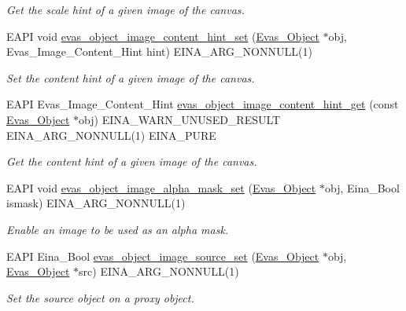 \begin{DoxyCompactItemize}
\begin{DoxyCompactList}\small\item\em Get the scale hint of a given image of the canvas. \item\end{DoxyCompactList}\item 
EAPI void \hyperlink{group__Evas__Object__Image_gaf6cc0faf39773e12eb496116afd67c6f}{evas\_\-object\_\-image\_\-content\_\-hint\_\-set} (\hyperlink{group__Evas__Object__Group_ga9e19e6dd1f517a0ba437c0114d3e7c97}{Evas\_\-Object} $\ast$obj, Evas\_\-Image\_\-Content\_\-Hint hint) EINA\_\-ARG\_\-NONNULL(1)
\begin{DoxyCompactList}\small\item\em Set the content hint of a given image of the canvas. \item\end{DoxyCompactList}\item 
EAPI Evas\_\-Image\_\-Content\_\-Hint \hyperlink{group__Evas__Object__Image_ga28881040682dbbf00937948124e9f3fb}{evas\_\-object\_\-image\_\-content\_\-hint\_\-get} (const \hyperlink{group__Evas__Object__Group_ga9e19e6dd1f517a0ba437c0114d3e7c97}{Evas\_\-Object} $\ast$obj) EINA\_\-WARN\_\-UNUSED\_\-RESULT EINA\_\-ARG\_\-NONNULL(1) EINA\_\-PURE
\begin{DoxyCompactList}\small\item\em Get the content hint of a given image of the canvas. \item\end{DoxyCompactList}\item 
EAPI void \hyperlink{group__Evas__Object__Image_ga154d8315842f4602878704951705e6cb}{evas\_\-object\_\-image\_\-alpha\_\-mask\_\-set} (\hyperlink{group__Evas__Object__Group_ga9e19e6dd1f517a0ba437c0114d3e7c97}{Evas\_\-Object} $\ast$obj, Eina\_\-Bool ismask) EINA\_\-ARG\_\-NONNULL(1)
\begin{DoxyCompactList}\small\item\em Enable an image to be used as an alpha mask. \item\end{DoxyCompactList}\item 
EAPI Eina\_\-Bool \hyperlink{group__Evas__Object__Image_ga8f3b7eb8efaa3d77b9908a080b3d4c55}{evas\_\-object\_\-image\_\-source\_\-set} (\hyperlink{group__Evas__Object__Group_ga9e19e6dd1f517a0ba437c0114d3e7c97}{Evas\_\-Object} $\ast$obj, \hyperlink{group__Evas__Object__Group_ga9e19e6dd1f517a0ba437c0114d3e7c97}{Evas\_\-Object} $\ast$src) EINA\_\-ARG\_\-NONNULL(1)
\begin{DoxyCompactList}\small\item\em Set the source object on a proxy object. \item\end{DoxyCompactList}\item 

\end{DoxyCompactItemize}
